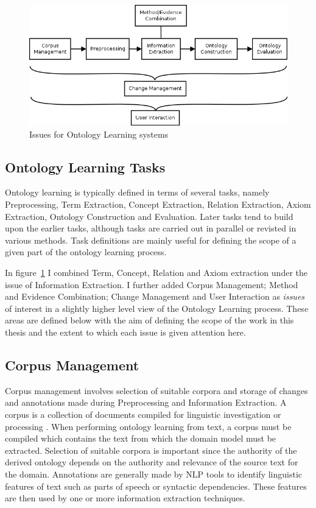 \documentclass[a4paper]{report}
\begin{document}
\begin{figure}
  \includegraphics[width=\textwidth]{graphics/ontology-learning-system-issues.png}
  \caption{Issues for Ontology Learning systems}
  \label{fig:ol-issues}
\end{figure}

\subsection{Ontology Learning Tasks}

Ontology learning is typically defined in terms of several tasks, namely Preprocessing, Term Extraction, Concept Extraction, Relation Extraction, Axiom Extraction, Ontology Construction and Evaluation.
Later tasks tend to build upon the earlier tasks, although tasks are carried out in parallel or revisted in various methods.
Task definitions are mainly useful for defining the scope of a given part of the ontology learning process.

In figure~\ref{fig:ol-issues} I combined Term, Concept, Relation and Axiom extraction under the issue of Information Extraction.
I further added Corpus Management; Method and Evidence Combination; Change Management and User Interaction as \emph{issues} of interest in a slightly higher level view of the Ontology Learning process.
These areas are defined below with the aim of defining the scope of the work in this thesis and the extent to which each issue is given attention here.

\subsection{Corpus Management}

Corpus management involves selection of suitable corpora and storage of changes and annotations made during Preprocessing and Information Extraction.
A corpus is a collection of documents compiled for linguistic investigation or processing \citep{KokkinakisGerdin10MedCorp}.
When performing ontology learning from text, a corpus must be compiled which contains the text from which the domain model must be extracted.
Selection of suitable corpora is important since the authority of the derived ontology depends on the authority and relevance of the source text for the domain.
Annotations are generally made by NLP tools to identify linguistic features of text such as parts of speech or syntactic dependencies.
These features are then used by one or more information extraction techniques.
\end{document}
